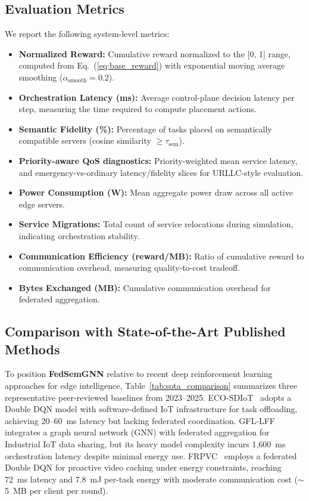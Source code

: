 \documentclass[conference]{IEEEtran}
\begin{document}
		\subsection{Evaluation Metrics}
		We report the following system-level metrics:
		\begin{itemize}
			\item \textbf{Normalized Reward:} Cumulative reward normalized to the [0, 1] range, computed from Eq.~(\ref{eq:base_reward}) with exponential moving average smoothing ($\alpha_{\text{smooth}} = 0.2$).
			\item \textbf{Orchestration Latency (ms):} Average control-plane decision latency per step, measuring the time required to compute placement actions.
			\item \textbf{Semantic Fidelity (\%):} Percentage of tasks placed on semantically compatible servers (cosine similarity $\geq \tau_{\text{sem}}$).
			\item \textbf{Priority-aware QoS diagnostics:} Priority-weighted mean service latency, and emergency-vs-ordinary latency/fidelity slices for URLLC-style evaluation.
			\item \textbf{Power Consumption (W):} Mean aggregate power draw across all active edge servers.
			\item \textbf{Service Migrations:} Total count of service relocations during simulation, indicating orchestration stability.
			\item \textbf{Communication Efficiency (reward/MB):} Ratio of cumulative reward to communication overhead, measuring quality-to-cost tradeoff.
			\item \textbf{Bytes Exchanged (MB):} Cumulative communication overhead for federated aggregation.
		\end{itemize}
		
		\subsection{Comparison with State-of-the-Art Published Methods}
		\label{subsec:sota_comparison}
		
		To position \textbf{FedSemGNN} relative to recent deep reinforcement learning approaches for edge intelligence, Table~\ref{tab:sota_comparison} summarizes three representative peer-reviewed baselines from 2023--2025. 
		ECO-SDIoT~\cite{zhu2023eco} adopts a Double DQN model with software-defined IoT infrastructure for task offloading, achieving 20--60~ms latency but lacking federated coordination. 
		GFL-LFF~\cite{regan2024gfl} integrates a graph neural network (GNN) with federated aggregation for Industrial IoT data sharing, but its heavy model complexity incurs 1{,}600~ms orchestration latency despite minimal energy use. 
		FRPVC~\cite{qian2025frpvc} employs a federated Double DQN for proactive video caching under energy constraints, reaching 72~ms latency and 7.8~mJ per-task energy with moderate communication cost ($\sim$5~MB per client per round). 
		
\end{document}
